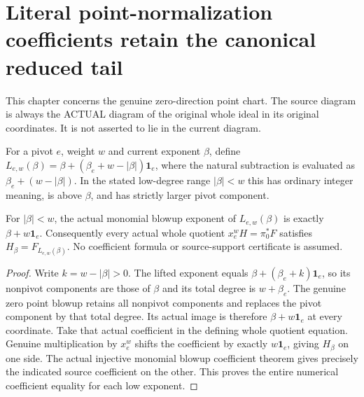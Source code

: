 \section{Literal point-normalization coefficients retain the canonical reduced tail}

This chapter concerns the genuine zero-direction point chart. The
source diagram is always the ACTUAL diagram of the original whole
ideal in its original coordinates. It is not asserted to lie in the
current diagram.

\begin{definition}
\label{hir:actual-zero-point-low-source-exponent}
\leanok
For a pivot $e$, weight $w$ and current exponent $\beta$, define
$L_{e,w}(\beta)=\beta+(\beta_e+w-|\beta|)\mathbf1_e$,
where the natural subtraction is evaluated as
$\beta_e+(w-|\beta|)$. In the stated low-degree range $|\beta|<w$
this has ordinary integer meaning, is above $\beta$, and has strictly
larger pivot component.
\end{definition}

\begin{theorem}
\label{hir:actual-zero-point-low-coefficient-source-dictionary}
\leanok
For $|\beta|<w$, the actual monomial blowup exponent of
$L_{e,w}(\beta)$ is exactly $\beta+w\mathbf1_e$.
Consequently every actual whole quotient $x_e^wH=\pi_0^*F$
satisfies $H_\beta=F_{L_{e,w}(\beta)}$. No coefficient formula or
source-support certificate is assumed.
\end{theorem}
\begin{proof}
Write $k=w-|\beta|>0$. The lifted exponent equals
$\beta+(\beta_e+k)\mathbf1_e$, so its nonpivot components are those
of $\beta$ and its total degree is $w+\beta_e$.
The genuine zero point blowup retains all nonpivot components and
replaces the pivot component by that total degree. Its actual image
is therefore $\beta+w\mathbf1_e$ at every coordinate. Take that
actual coefficient in the defining whole quotient equation. Genuine
multiplication by $x_e^w$ shifts the coefficient by exactly
$w\mathbf1_e$, giving $H_\beta$ on one side. The actual injective
monomial blowup coefficient theorem gives precisely the indicated
source coefficient on the other. This proves the entire numerical
coefficient equality for each low exponent.
\end{proof}

